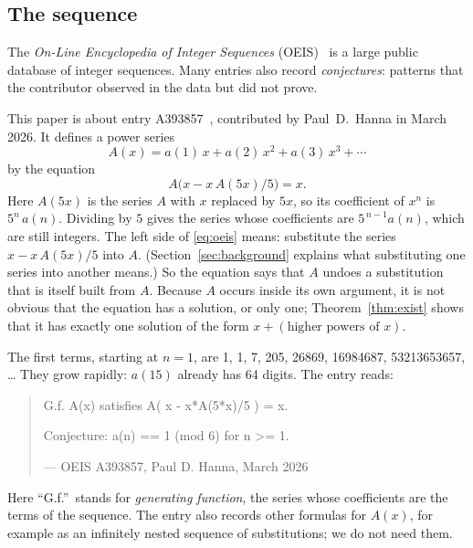 \documentclass[11pt,a4paper]{article}
\theoremstyle{definition}
\theoremstyle{remark}
\begin{document}
\subsection{The sequence}\label{sec:sequence}
The \emph{On-Line Encyclopedia of Integer Sequences} (OEIS)~\cite{oeisdb} is a large public database of integer
sequences. Many
entries also record \emph{conjectures}: patterns that the contributor observed in the data but did not prove.

This paper is about entry A393857~\cite{oeis}, contributed by Paul~D.~Hanna in March 2026. It defines a power series
\[
A(x)=a(1)\,x+a(2)\,x^2+a(3)\,x^3+\cdots
\]
by the equation
\begin{equation}\label{eq:oeis}
A\bigl(x-x\,A(5x)/5\bigr)=x.
\end{equation}
Here $A(5x)$ is the series $A$ with $x$ replaced by $5x$, so its coefficient of $x^n$ is
$5^n\,a(n)$. Dividing by $5$ gives the series whose coefficients are
$5^{\,n-1}a(n)$, which are still integers. The left side of \eqref{eq:oeis} means: substitute the series
$x-x\,A(5x)/5$ into $A$. (Section~\ref{sec:background} explains what substituting one
series into another means.) So the equation says that $A$ undoes a substitution that is itself built from $A$. Because
$A$ occurs inside its own argument, it is not obvious that the equation has a solution, or only one; Theorem~\ref{thm:exist}
shows that it has exactly one solution of the form $x+(\text{higher powers of }x)$.

The first terms, starting at $n=1$, are 1, 1, 7, 205, 26869, 16984687, 53213653657, \dots{} They grow rapidly: $a(15)$
already has 64 digits. The entry reads:
\begin{quote}\small\ttfamily\raggedright G.f. A(x) satisfies A( x - x*A(5*x)/5 ) = x.\par\smallskip Conjecture: a(n) == 1 (mod 6) for n >= 1.\par\smallskip\hfill\textrm{--- OEIS A393857, Paul D. Hanna, March 2026}\end{quote}

Here ``G.f.''\ stands for \emph{generating function}, the series whose coefficients are the terms of the sequence.
The entry also records other formulas for $A(x)$, for example as an infinitely nested sequence of substitutions; we do
not need them.
\end{document}
